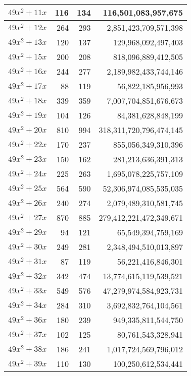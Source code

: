 \documentclass[a4paper]{amsproc}
\theoremstyle{plain}
\theoremstyle{named}
\begin{document}
\begin{longtable}{ | l | r | r | r | }
$49x^2 + 11x$ & 116 & 134 & 116{,}501{,}083{,}957{,}675 \\ \hline
$49x^2 + 12x$ & 264 & 293 & 2{,}851{,}423{,}709{,}571{,}398 \\ \hline
$49x^2 + 13x$ & 120 & 137 & 129{,}968{,}092{,}497{,}403 \\ \hline
$49x^2 + 15x$ & 200 & 208 & 818{,}096{,}889{,}412{,}505 \\ \hline
$49x^2 + 16x$ & 244 & 277 & 2{,}189{,}982{,}433{,}744{,}146 \\ \hline
$49x^2 + 17x$ & 88 & 119 & 56{,}822{,}185{,}956{,}993 \\ \hline
$49x^2 + 18x$ & 339 & 359 & 7{,}007{,}704{,}851{,}676{,}673 \\ \hline
$49x^2 + 19x$ & 104 & 126 & 84{,}381{,}628{,}848{,}199 \\ \hline
$49x^2 + 20x$ & 810 & 994 & 318{,}311{,}720{,}796{,}474{,}145 \\ \hline
$49x^2 + 22x$ & 170 & 237 & 855{,}056{,}349{,}310{,}396 \\ \hline
$49x^2 + 23x$ & 150 & 162 & 281{,}213{,}636{,}391{,}313 \\ \hline
$49x^2 + 24x$ & 225 & 263 & 1{,}695{,}078{,}225{,}757{,}109 \\ \hline
$49x^2 + 25x$ & 564 & 590 & 52{,}306{,}974{,}085{,}535{,}035 \\ \hline
$49x^2 + 26x$ & 240 & 274 & 2{,}079{,}489{,}310{,}581{,}745 \\ \hline
$49x^2 + 27x$ & 870 & 885 & 279{,}412{,}221{,}472{,}349{,}671 \\ \hline
$49x^2 + 29x$ & 94 & 121 & 65{,}549{,}394{,}759{,}169 \\ \hline
$49x^2 + 30x$ & 249 & 281 & 2{,}348{,}494{,}510{,}013{,}897 \\ \hline
$49x^2 + 31x$ & 87 & 119 & 56{,}221{,}416{,}846{,}301 \\ \hline
$49x^2 + 32x$ & 342 & 474 & 13{,}774{,}615{,}119{,}539{,}521 \\ \hline
$49x^2 + 33x$ & 549 & 576 & 47{,}279{,}974{,}584{,}923{,}731 \\ \hline
$49x^2 + 34x$ & 284 & 310 & 3{,}692{,}832{,}764{,}104{,}561 \\ \hline
$49x^2 + 36x$ & 180 & 239 & 949{,}335{,}811{,}544{,}750 \\ \hline
$49x^2 + 37x$ & 102 & 125 & 80{,}761{,}543{,}328{,}941 \\ \hline
$49x^2 + 38x$ & 186 & 241 & 1{,}017{,}724{,}569{,}796{,}012 \\ \hline
$49x^2 + 39x$ & 110 & 130 & 100{,}250{,}612{,}534{,}441 \\ \hline

\end{longtable}
\end{document}
